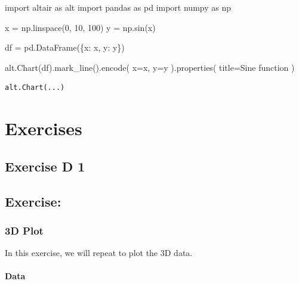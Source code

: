 \documentclass[
  letterpaper,
  DIV=11,
  numbers=noendperiod]{scrreprt}
\newenvironment{Shaded}{\begin{snugshade}}{\end{snugshade}}
\newcommand{\DecValTok}[1]{\textcolor[rgb]{0.68,0.00,0.00}{#1}}
\newcommand{\ImportTok}[1]{\textcolor[rgb]{0.00,0.46,0.62}{#1}}
\newcommand{\NormalTok}[1]{\textcolor[rgb]{0.00,0.23,0.31}{#1}}
\newcommand{\OperatorTok}[1]{\textcolor[rgb]{0.37,0.37,0.37}{#1}}
\newcommand{\StringTok}[1]{\textcolor[rgb]{0.13,0.47,0.30}{#1}}
\begin{document}
\begin{Shaded}
\begin{Highlighting}[]
\ImportTok{import}\NormalTok{ altair }\ImportTok{as}\NormalTok{ alt}
\ImportTok{import}\NormalTok{ pandas }\ImportTok{as}\NormalTok{ pd}
\ImportTok{import}\NormalTok{ numpy }\ImportTok{as}\NormalTok{ np}

\NormalTok{x }\OperatorTok{=}\NormalTok{ np.linspace(}\DecValTok{0}\NormalTok{, }\DecValTok{10}\NormalTok{, }\DecValTok{100}\NormalTok{)}
\NormalTok{y }\OperatorTok{=}\NormalTok{ np.sin(x)}

\NormalTok{df }\OperatorTok{=}\NormalTok{ pd.DataFrame(\{}\StringTok{\textquotesingle{}x\textquotesingle{}}\NormalTok{: x, }\StringTok{\textquotesingle{}y\textquotesingle{}}\NormalTok{: y\})}

\NormalTok{alt.Chart(df).mark\_line().encode(}
\NormalTok{    x}\OperatorTok{=}\StringTok{\textquotesingle{}x\textquotesingle{}}\NormalTok{,}
\NormalTok{    y}\OperatorTok{=}\StringTok{\textquotesingle{}y\textquotesingle{}}
\NormalTok{).properties(}
\NormalTok{    title}\OperatorTok{=}\StringTok{\textquotesingle{}Sine function\textquotesingle{}}
\NormalTok{)}
\end{Highlighting}
\end{Shaded}

\begin{verbatim}
alt.Chart(...)
\end{verbatim}

\part{Exercises}

\chapter{Exercise D 1}\label{exercise-d-1}

\chapter{Exercise:}\label{exercise-4}

\section{3D Plot}\label{d-plot-1}

In this exercise, we will repeat to plot the 3D data.

\subsection{Data}\label{data-4}
\end{document}
